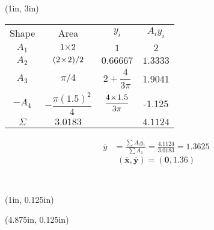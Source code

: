 \documentclass[10pt,oneside]{article}
\def\scale{1}
\begin{document}
\begin{textblock*}{6.75in}(1in, 3in)
	\centering
	
	\Large\parb\vspace{1cm}\centering
	\begin{tabular}{cccc}
			Shape  & Area  & $y_i$ & $A_iy_i$   \\
			\addlinespace
			\midrule
			$A_1$  & $1\!\times\! 2$   & $1$  & \textcolor{saitRed}{$2$}   \\
			\midrule
			$A_2$  & $(2\!\times\! 2)/2$ & $0.66667$  & \textcolor{saitRed}{$1.3333$}   \\
			\midrule
			$A_3$  & $\pi/4$  & $2+\dfrac{4}{3\pi}$ & \textcolor{saitRed}{1.9041}    \\
			\midrule
			$-A_4$  & $-\dfrac{\pi(1.5)^2}{4}$  & $\dfrac{4\!\times\! 1.5}{3\pi}$ & \textcolor{saitRed}{-1.125}    \\
			
			\bottomrule\addlinespace
			{\Large$\Sigma$} & \textcolor{saitRed}{$3.0183$} &   & \textcolor{saitRed}{$4.1124$}
		\end{tabular}
		\parb
		\begin{align*}
			\overline{y} &= \frac{\sum A_iy_1}{\sum A_1}=\frac{4.1124}{3.0183} = 1.3625
		\end{align*}
		\parb
		$$ \bm{(\overline{x}, \overline{y}) = (0, 1.36)} $$
\end{textblock*}


~\newpage


\begin{textblock*}{3.25in}(1in, 0.125in)
\end{textblock*}
\begin{textblock*}{3in}(4.875in, 0.125in)
	\cbox{
	\centering
	\def\scale{0.65}
	
	}
\end{textblock*}
\end{document}
